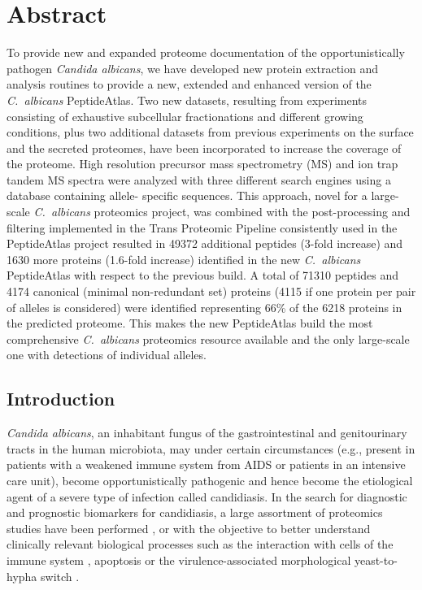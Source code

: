 \newpage


\chapter*{Abstract}
To provide new and expanded proteome documentation of the opportunistically pathogen
\textit{Candida albicans}, we have developed new protein extraction and analysis routines to
provide a new, extended and enhanced version of the \textit{\mbox{C. albicans}} PeptideAtlas. Two new
datasets, resulting from experiments consisting of exhaustive subcellular fractionations and
different growing conditions, plus two additional datasets from previous experiments on the
surface and the secreted proteomes, have been incorporated to increase the coverage of the
proteome. High resolution precursor mass spectrometry (MS) and ion trap tandem MS
spectra were analyzed with three different search engines using a database containing allele-
specific sequences. This approach, novel for a large-scale \textit{\mbox{C. albicans}} proteomics project,
was combined with the post-processing and filtering
implemented in the Trans Proteomic Pipeline consistently used in the PeptideAtlas project
resulted in 49372 additional peptides (3-fold increase) and 1630 more proteins (1.6-fold increase)
identified in the new
\textit{\mbox{C. albicans}} PeptideAtlas with respect to the previous build. A total of 71310 peptides and
4174 canonical (minimal non-redundant set) proteins (4115 if one protein per pair of alleles is
considered) were identified representing 66\% of the 6218 proteins in the predicted proteome.
This makes the new PeptideAtlas build the most comprehensive \textit{\mbox{C. albicans}} proteomics
resource available and the only large-scale one with detections of individual alleles.

\newpage

\section*{Introduction}

\textit{Candida albicans}, an inhabitant fungus of the gastrointestinal and genitourinary tracts in the
human microbiota, may under certain circumstances (e.g., present in patients with a
weakened immune system from AIDS or patients in an intensive care unit), become
opportunistically pathogenic and hence become the etiological agent of a severe type of
infection called candidiasis. In the search for diagnostic and prognostic biomarkers for
candidiasis, a large assortment of proteomics studies have been performed \citep{Pitarch2011}, or with the
objective to better understand clinically relevant biological processes such as the interaction
with cells of the immune system \citep{Fernandez-Arenas2007,Cheng2012a,Gow2011}, 
apoptosis \citep{Ramsdale2008,Hao2013c} or the virulence-associated
morphological yeast-to-hypha switch \citep{Monteoliva2010,Vialas2012}. 

